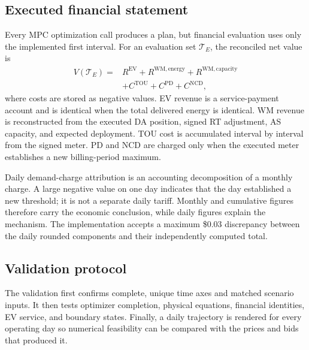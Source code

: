 \documentclass[final,5p,times]{elsarticle}
\newcommand{\EV}{\mathrm{EV}}
\newcommand{\TOU}{\mathrm{TOU}}
\newcommand{\PD}{\mathrm{PD}}
\newcommand{\NCD}{\mathrm{NCD}}
\newcommand{\WM}{\mathrm{WM}}
\begin{document}
\subsection{Executed financial statement}
Every MPC optimization call produces a plan, but financial evaluation uses only the implemented first interval. For an evaluation set $\mathcal T_E$, the reconciled net value is
\begin{align}
V(\mathcal T_E)={}&R^{\EV}+R^{\WM,\mathrm{energy}}
+R^{\WM,\mathrm{capacity}}\nonumber\\
&+C^{\TOU}+C^{\PD}+C^{\NCD},
\label{eq:financial_identity}
\end{align}
where costs are stored as negative values. EV revenue is a service-payment account and is identical when the total delivered energy is identical. WM revenue is reconstructed from the executed DA position, signed RT adjustment, AS capacity, and expected deployment. TOU cost is accumulated interval by interval from the signed meter. PD and NCD are charged only when the executed meter establishes a new billing-period maximum.

Daily demand-charge attribution is an accounting decomposition of a monthly charge. A large negative value on one day indicates that the day established a new threshold; it is not a separate daily tariff. Monthly and cumulative figures therefore carry the economic conclusion, while daily figures explain the mechanism. The implementation accepts a maximum \$0.03 discrepancy between the daily rounded components and their independently computed total.

\subsection{Validation protocol}
The validation first confirms complete, unique time axes and matched scenario
inputs. It then tests optimizer completion, physical equations, financial
identities, EV service, and boundary states. Finally, a daily trajectory is
rendered for every operating day so numerical feasibility can be compared with
the prices and bids that produced it.
\end{document}
